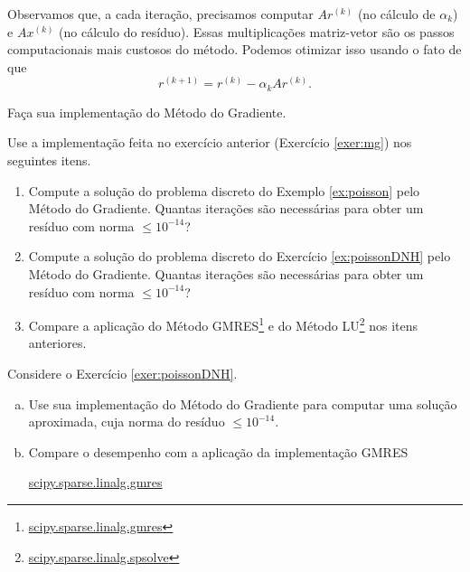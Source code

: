 \begin{obs}
  Observamos que, a cada iteração, precisamos computar $Ar^{(k)}$ (no cálculo de $\alpha_k$) e $Ax^{(k)}$ (no cálculo do resíduo). Essas multiplicações matriz-vetor são os passos computacionais mais custosos do método. Podemos otimizar isso usando o fato de que
  \begin{equation}
    r^{(k+1)} = r^{(k)} - \alpha_k Ar^{(k)}.
  \end{equation}
\end{obs}

% 

\begin{exer}\label{exer:mg}
  Faça sua implementação do Método do Gradiente.
\end{exer}

\begin{exer}\label{exer:mg}
  Use a implementação feita no exercício anterior (Exercício \ref{exer:mg}) nos seguintes itens.
  \begin{enumerate}
  \item Compute a solução do problema discreto do Exemplo \ref{ex:poisson} pelo Método do Gradiente. Quantas iterações são necessárias para obter um resíduo com norma $\leq 10^{-14}$?
  \item Compute a solução do problema discreto do Exercício \ref{ex:poissonDNH} pelo Método do Gradiente. Quantas iterações são necessárias para obter um resíduo com norma $\leq 10^{-14}$?
  \item Compare a aplicação do Método GMRES\footnote{\href{https://docs.scipy.org/doc/scipy/reference/generated/scipy.sparse.linalg.gmres.html}{scipy.sparse.linalg.gmres}} e do Método LU\footnote{\href{https://docs.scipy.org/doc/scipy/reference/generated/scipy.sparse.linalg.spsolve.html}{scipy.sparse.linalg.spsolve}} nos itens anteriores.
  \end{enumerate}
\end{exer}

\begin{exer}
  Considere o Exercício \ref{exer:poissonDNH}.
  \begin{enumerate}[a)]
  \item Use sua implementação do Método do Gradiente para computar uma solução aproximada, cuja norma do resíduo $\leq 10^{-14}$.
  \item Compare o desempenho com a aplicação da implementação GMRES
    \begin{center}
      \href{https://docs.scipy.org/doc/scipy/reference/generated/scipy.sparse.linalg.gmres.html}{scipy.sparse.linalg.gmres}
    \end{center}
  \end{enumerate}
\end{exer}


